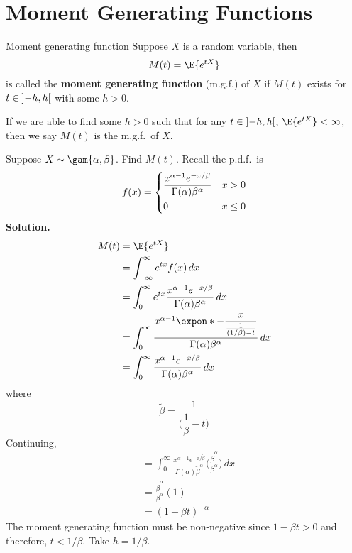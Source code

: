 \section{Moment Generating Functions}
\begin{Definition}{Moment generating function}{}
    Suppose $ X $ is a random variable, then
    \[ M(t)=\E{e^{tX}} \]
    is called the \textbf{moment generating function} (m.g.f.) of $ X $
    if $ M(t) $ exists for $ t\in\interval[open]{-h}{h} $ with some $ h>0 $.
\end{Definition}
\begin{Remark}{}{}
    If we are able to find some $ h>0 $ such that for any
    $ t\in\interval[open]{-h}{h} $,
    $ \E{e^{tX}}<\infty $, then we
    say $ M(t) $ is the m.g.f.\ of $ X $.
\end{Remark}

\begin{Example}{}{}
    Suppose $ X \sim \gam{\alpha,\beta}$.
    Find $ M(t) $.
    Recall the p.d.f.\ is
    \[ f(x)=\begin{dcases}
            \frac{x^{\alpha-1}e^{-x/\beta}}{\Gamma(\alpha)\beta^\alpha} & x>0    \\
            0                                                           & x\le 0
        \end{dcases}
    \]
    \textbf{Solution.}
    \begin{align*}
        M(t)
         & =\E{e^{tX}}                                                                                     \\
         & =\int_{-\infty}^{\infty} e^{tx}f(x)\, d{x}                                                      \\
         & =\int_{0}^{\infty} e^{tx} \frac{x^{\alpha-1}e^{-x/\beta}}{
        \Gamma(\alpha)\beta^\alpha
        } \, d{x}                                                                                          \\
         & =\int_{0}^{\infty} \frac{x^{\alpha-1}\expon*{\displaystyle
                -\frac{x}{\frac{1}{(1/\beta)-t} }}} {
            \Gamma(\alpha)\beta^\alpha
        } \, d{x}                                                                                          \\
         & = \int_{0}^{\infty} \frac{x^{\alpha-1}e^{-x/\tilde{\beta}}}{\Gamma(\alpha)\beta^\alpha} \, d{x}
    \end{align*}
    where
    \[ \tilde{\beta}=\dfrac{1}{\biggl(\dfrac{1}{\beta}-t\biggr)}  \]
    Continuing,
    \begin{align*}
         & =\int_{0}^{\infty} \frac{x^{\alpha-1}e^{-x/\tilde{\beta}}}{\Gamma(\alpha)
        \tilde{\beta}^\alpha} \biggl( \frac{\tilde{\beta}^\alpha}{\beta^\alpha} \biggr)  \, d{x} \\
         & =\frac{\tilde{\beta}^\alpha}{\beta^\alpha}(1)                                         \\
         & =(1-\beta t)^{-\alpha}
    \end{align*}
    The moment generating function must be non-negative since
    $ 1-\beta t>0 $ and therefore, $ t<1/\beta $. Take $ h=1/\beta $.
\end{Example}

